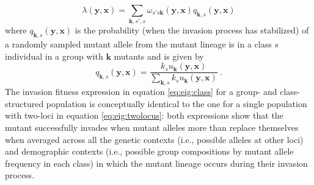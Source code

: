 \documentclass[11pt]{article}
\renewcommand{\vec}[1]{\symbf{#1}}
\newcommand{\eig}{\lambda}
\begin{document}
\begin{equation}
  \label{eq:eig:class}
  \eig(\vec{y}, \vec{x}) = \sum_{\vec{k},s',s} \omega_{s's\vec{k}}(\vec{y}, \vec{x}) q_{\vec{k},s}(\vec{y}, \vec{x})
\end{equation}
where $q_{\vec{k},s}(\vec{y}, \vec{x})$ is the probability (when the invasion process has stabilized) of a randomly sampled mutant allele from the mutant lineage is in a class $s$ individual in a group with $\vec{k}$ mutants and is given by
\begin{equation*}
  q_{\vec{k},s}(\vec{y}, \vec{x}) = \frac{k_{s} u_{\vec{k}}(\vec{y}, \vec{x})}{\sum_{\vec{k},s} k_{s} u_{\vec{k}}(\vec{y}, \vec{x})} \: .
\end{equation*}
The invasion fitness expression in equation \eqref{eq:eig:class} for a group- and class-structured population is conceptually identical to the one for a single population with two-loci in equation \eqref{eq:eig:twolocus}: both expressions show that the mutant successfully invades when mutant alleles more than replace themselves when averaged across all the genetic contexts (i.e., possible alleles at other loci) and demographic contexts (i.e., possible group compositions by mutant allele frequency in each class) in which the mutant lineage occurs during their invasion process.
\end{document}
